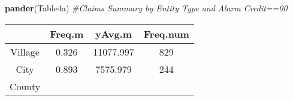 \documentclass[]{book}
\newenvironment{Shaded}{\begin{snugshade}}{\end{snugshade}}
\newcommand{\KeywordTok}[1]{\textcolor[rgb]{0.13,0.29,0.53}{\textbf{#1}}}
\newcommand{\CommentTok}[1]{\textcolor[rgb]{0.56,0.35,0.01}{\textit{#1}}}
\newcommand{\NormalTok}[1]{#1}
\theoremstyle{definition}
\theoremstyle{definition}
\theoremstyle{definition}
\theoremstyle{remark}
\begin{document}
\begin{Shaded}
\begin{Highlighting}[]
\KeywordTok{pander}\NormalTok{(Table4a) }\CommentTok{#Claims Summary by Entity Type and Alarm Credit==00}
\end{Highlighting}
\end{Shaded}

\begin{longtable}[]{@{}cccc@{}}
\toprule
\begin{minipage}[b]{0.12\columnwidth}\centering\strut
~\strut
\end{minipage} & \begin{minipage}[b]{0.11\columnwidth}\centering\strut
Freq.m\strut
\end{minipage} & \begin{minipage}[b]{0.15\columnwidth}\centering\strut
yAvg.m\strut
\end{minipage} & \begin{minipage}[b]{0.15\columnwidth}\centering\strut
Freq.num\strut
\end{minipage}\tabularnewline
\midrule
\endhead
\begin{minipage}[t]{0.12\columnwidth}\centering\strut
Village\strut
\end{minipage} & \begin{minipage}[t]{0.11\columnwidth}\centering\strut
0.326\strut
\end{minipage} & \begin{minipage}[t]{0.15\columnwidth}\centering\strut
11077.997\strut
\end{minipage} & \begin{minipage}[t]{0.15\columnwidth}\centering\strut
829\strut
\end{minipage}\tabularnewline
\begin{minipage}[t]{0.12\columnwidth}\centering\strut
City\strut
\end{minipage} & \begin{minipage}[t]{0.11\columnwidth}\centering\strut
0.893\strut
\end{minipage} & \begin{minipage}[t]{0.15\columnwidth}\centering\strut
7575.979\strut
\end{minipage} & \begin{minipage}[t]{0.15\columnwidth}\centering\strut
244\strut
\end{minipage}\tabularnewline
\begin{minipage}[t]{0.12\columnwidth}\centering\strut
County\strut
\end{minipage} & \begin{minipage}[t]{0.11\columnwidth}\centering\strut

\end{minipage}
\end{longtable}
\end{document}
